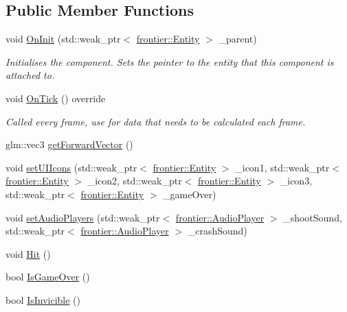 \subsection*{Public Member Functions}
\begin{DoxyCompactItemize}
\item 
void \hyperlink{class_player_controller_a22c60d9e4464ee585f3592593f14bc50}{On\+Init} (std\+::weak\+\_\+ptr$<$ \hyperlink{classfrontier_1_1_entity}{frontier\+::\+Entity} $>$ \+\_\+parent)
\begin{DoxyCompactList}\small\item\em Initialises the component. Sets the pointer to the entity that this component is attached to. \end{DoxyCompactList}\item 
void \hyperlink{class_player_controller_a5641058df338563ff6bb6bce7645ef7b}{On\+Tick} () override
\begin{DoxyCompactList}\small\item\em Called every frame, use for data that needs to be calculated each frame. \end{DoxyCompactList}\item 
glm\+::vec3 \hyperlink{class_player_controller_a32543b8dc76ddb473c77afa03760e4d6}{get\+Forward\+Vector} ()
\item 
void \hyperlink{class_player_controller_a6fe2f80c8a3bac13c044e848b12f86ab}{set\+U\+I\+Icons} (std\+::weak\+\_\+ptr$<$ \hyperlink{classfrontier_1_1_entity}{frontier\+::\+Entity} $>$ \+\_\+icon1, std\+::weak\+\_\+ptr$<$ \hyperlink{classfrontier_1_1_entity}{frontier\+::\+Entity} $>$ \+\_\+icon2, std\+::weak\+\_\+ptr$<$ \hyperlink{classfrontier_1_1_entity}{frontier\+::\+Entity} $>$ \+\_\+icon3, std\+::weak\+\_\+ptr$<$ \hyperlink{classfrontier_1_1_entity}{frontier\+::\+Entity} $>$ \+\_\+game\+Over)
\item 
void \hyperlink{class_player_controller_a9bceb77b4a1d71290cc057ab16b64e8b}{set\+Audio\+Players} (std\+::weak\+\_\+ptr$<$ \hyperlink{classfrontier_1_1_audio_player}{frontier\+::\+Audio\+Player} $>$ \+\_\+shoot\+Sound, std\+::weak\+\_\+ptr$<$ \hyperlink{classfrontier_1_1_audio_player}{frontier\+::\+Audio\+Player} $>$ \+\_\+crash\+Sound)
\item 
void \hyperlink{class_player_controller_a7d329fd3ea21feff185a8d700e156a0c}{Hit} ()
\item 
bool \hyperlink{class_player_controller_a420a6722e37b0eb5219d4c2475c47041}{Is\+Game\+Over} ()
\item 
bool \hyperlink{class_player_controller_a8cd8a56ee0332aebb447db6a691aa639}{Is\+Invicible} ()
\end{DoxyCompactItemize}

